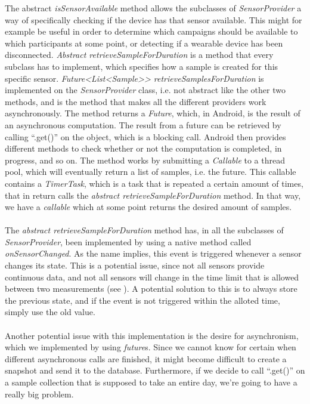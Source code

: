 The abstract \emph{isSensorAvailable} method allows the subclasses of \emph{SensorProvider} a way of specifically checking if the device has that sensor available. This might for example be useful in order to determine which campaigns should be available to which participants at some point, or detecting if a wearable device has been disconnected. \emph{Abstract retrieveSampleForDuration} is a method that every subclass has to implement, which specifies how a sample is created for this specific sensor. \emph{Future<List<Sample>> retrieveSamplesForDuration} is implemented on the \emph{SensorProvider} class, i.e. not abstract like the other two methods, and is the method that makes all the different providers work asynchronously. The method returns a \emph{Future}, which, in Android, is the result of an asynchronous computation. The result from a future can be retrieved by calling ``.get()'' on the object, which is a blocking call. Android then provides different methods to check whether or not the computation is completed, in progress, and so on. The method works by submitting a \emph{Callable} to a thread pool, which will eventually return a list of samples, i.e. the future. This callable contains a \emph{TimerTask}, which is a task that is repeated a certain amount of times, that in return calls the \emph{abstract retrieveSampleForDuration} method. In that way, we have a \emph{callable} which at some point returns the desired amount of samples. 
\\\\
The \emph{abstract retrieveSampleForDuration} method has, in all the subclasses of \emph{SensorProvider}, been implemented by using a native method called \emph{onSensorChanged}. As the name implies, this event is triggered whenever a sensor changes its state. This is a potential issue, since not all sensors provide continuous data, and not all sensors will change in the time limit that is allowed between two measurements (see ). A potential solution to this is to always store the previous state, and if the event is not triggered within the alloted time, simply use the old value. 
\\\\
Another potential issue with this implementation is the desire for asynchronism, which we implemented by using \emph{future}s. Since we cannot know for certain when different asynchronous calls are finished, it might become difficult to create a snapshot and send it to the database. Furthermore, if we decide to call ``.get()'' on a sample collection that is supposed to take an entire day, we're going to have a really big problem. 

% 